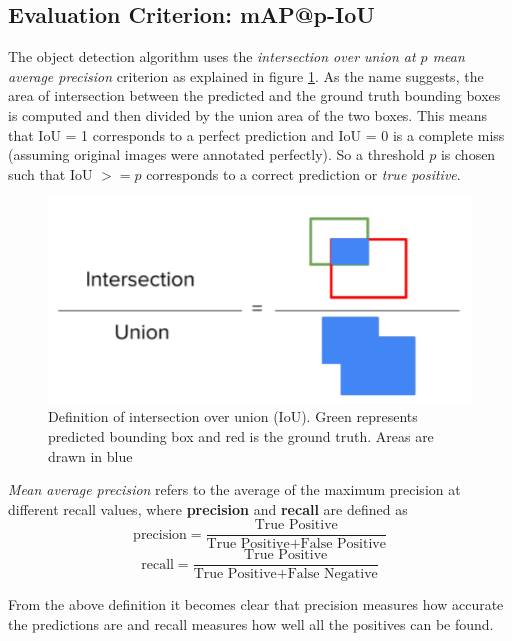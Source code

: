 		\subsection{Evaluation Criterion: mAP@p-IoU}
		  The object detection algorithm uses the \textit{intersection over union at $p$ mean average precision} criterion as explained in figure \ref{fig:iou_def}. As the  name suggests, the area of intersection between the predicted and the ground truth bounding boxes is computed and then divided by the union area of the two boxes. This means that IoU = 1 corresponds to a perfect prediction and IoU = 0 is a complete miss (assuming original images were annotated perfectly). So a threshold $p$ is chosen such that IoU $>= p$ corresponds to a correct prediction or \textit{true positive}. 		  

		\begin{figure}
			\centering
			\includegraphics[scale=.5]{images/iou_def.png}
			\caption{Definition of intersection over union (IoU). Green represents predicted bounding box and red is the ground truth. Areas are drawn in blue}
			\label{fig:iou_def}
		\end{figure}				  
		  
		  \textit{Mean average precision} refers to the average of the maximum precision at different recall values, where \textbf{precision} and \textbf{recall} are defined as
		  \begin{equation}
		  	\text{precision} = \dfrac{\text{True Positive}}{ \text{True Positive} + \text{False Positive}}
		  \end{equation}
		  \begin{equation}
		  	\text{recall} = \dfrac{\text{True Positive}}{ \text{True Positive} + \text{False Negative}}
		  \end{equation}

		From the above definition it becomes clear that precision measures how accurate the predictions are and recall measures how well all the positives can be found.
		
